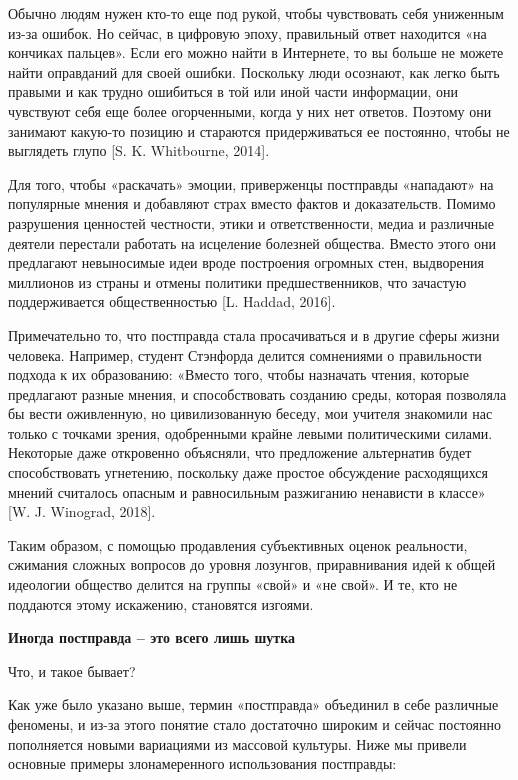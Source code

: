 Обычно людям нужен кто-то еще под рукой, чтобы чувствовать себя униженным из-за ошибок. Но сейчас, в цифровую эпоху, правильный ответ находится «на кончиках пальцев». Если его можно найти в Интернете, то вы больше не можете найти оправданий для своей ошибки. Поскольку люди осознают, как легко быть правыми и как трудно ошибиться в той или иной части информации, они чувствуют себя еще более огорченными, когда у них нет ответов. Поэтому они занимают какую-то позицию и стараются придерживаться ее постоянно, чтобы не выглядеть глупо [S. K. Whitbourne, 2014].

Для того, чтобы «раскачать» эмоции, приверженцы постправды «нападают» на популярные мнения и добавляют страх вместо фактов и доказательств. Помимо разрушения ценностей честности, этики и ответственности, медиа и различные деятели перестали работать на исцеление болезней общества. Вместо этого они предлагают невыносимые идеи вроде построения огромных стен, выдворения миллионов из страны и отмены политики предшественников, что зачастую поддерживается общественностью [L. Haddad, 2016].

Примечательно то, что постправда стала просачиваться и в другие сферы жизни человека. Например, студент Стэнфорда делится сомнениями о правильности подхода к их образованию: «Вместо того, чтобы назначать чтения, которые предлагают разные мнения, и способствовать созданию среды, которая позволяла бы вести оживленную, но цивилизованную беседу, мои учителя знакомили нас только с точками зрения, одобренными крайне левыми политическими силами. Некоторые даже откровенно объясняли, что предложение альтернатив будет способствовать угнетению, поскольку даже простое обсуждение расходящихся мнений считалось опасным и равносильным разжиганию ненависти в классе» [W. J. Winograd, 2018].

Таким образом, с помощью продавления субъективных оценок реальности, сжимания сложных вопросов до уровня лозунгов, приравнивания идей к общей идеологии общество делится на группы «свой» и «не свой». И те, кто не поддаются этому искажению, становятся изгоями.

\textbf{Иногда постправда – это всего лишь шутка}

Что, и такое бывает?

Как уже было указано выше, термин «постправда» объединил в себе различные феномены, и из-за этого понятие стало достаточно широким и сейчас постоянно пополняется новыми вариациями из массовой культуры. Ниже мы привели основные примеры злонамеренного использования постправды:


